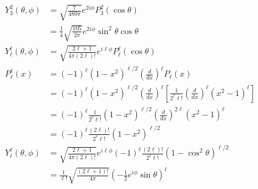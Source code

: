 \documentclass{article}
\begin{document}
\begin{align*}
  Y_3^2(\theta, \phi)       & = \sqrt{\frac{7}{480 \pi}} e^{2 i \phi} P_3^2 (\cos \theta)                                                                                                \\
                            & = \frac{1}{4} \sqrt{\frac{105}{2 \pi}} e^{2 i \phi} \sin^2 \theta \cos \theta                                                                              \\
  Y_\ell^\ell(\theta, \phi) & = \sqrt{\frac{2 \ell + 1}{4 \pi (2 \ell)!}} e^{i \ell \phi} P_\ell^\ell(\cos \theta)                                                                       \\
  P_\ell^\ell(x)            & = (-1)^\ell (1 - x^2)^{\ell / 2} \left( \frac{d}{d x} \right)^\ell P_\ell (x)                                                                              \\
                            & = (-1)^\ell (1 - x^2)^{\ell / 2} \left( \frac{d}{d x} \right)^\ell \left[ \frac{1}{2^\ell \ell!} \left( \frac{d}{d x} \right)^\ell (x^2 - 1)^\ell  \right] \\
                            & = (-1)^\ell \frac{1}{2^\ell \ell!} (1 - x^2)^{\ell / 2} \left( \frac{d}{d x} \right)^{2 \ell} (x^2 - 1)^\ell                                               \\
                            & = (-1)^\ell \frac{(2 \ell)!}{2^\ell \ell!} (1 - x^2)^{\ell / 2}                                                                                            \\
  Y_\ell^\ell(\theta, \phi) & = \sqrt{\frac{2 \ell + 1}{4 \pi (2 \ell)!}} e^{i \ell \phi} (-1)^\ell \frac{(2 \ell)!}{2^\ell \ell!} (1 - \cos^2 \theta)^{\ell / 2}                        \\
                            & = \frac{1}{\ell!} \sqrt{\frac{(2 \ell + 1)!}{4 \pi}} \left( -\frac{1}{2} e^{i \phi} \sin \theta \right)^\ell
\end{align*}

\setcounter{subsection}{8}
\subsection{}
\end{document}
